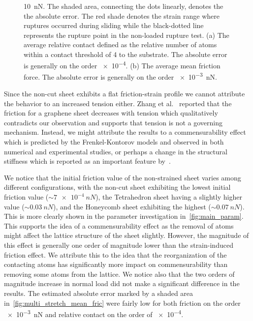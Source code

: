 \begin{figure}[H]
{     \SI{10}{nN}. The shaded area, connecting the dots linearly, denotes the
     the absolute error. The red shade denotes the strain range where ruptures
     occurred during sliding while the black-dotted line represents the rupture
     point in the non-loaded rupture test. (a) The average relative contact
     defined as the relative number of atoms within a contact threshold of
     \SI{4}{} to the substrate. The absolute error is generally on the
     order \num{e-4}. (b) The average mean friction force. The absolute error is generally on the order \SI{e-3}{nN}.}
     \label{fig:multi_stretch}
\end{figure}



Since the non-cut sheet exhibits a
flat friction-strain profile we cannot attribute the behavior to an increased
tension either. Zhang et al.~\cite{zhang_tuning_2019} reported that the friction
for a graphene sheet decreases with tension which qualitatively contradicts our
observation and supports that tension is not a governing mechanism. Instead, we
might attribute the results to a commensurability effect which is predicted by the Frenkel-Kontorov models and observed in both numerical and experimental studies, or perhaps a change in the structural stiffness which is reported as an important feature by~\cite{Kim_2012}. 

We notice that the initial friction value of the non-strained sheet varies among different configurations, with the non-cut sheet exhibiting the lowest initial friction value ($\sim \SI{7e-4}{nN}$), the Tetrahedron sheet having a slightly higher value ($\sim \SI{0.03}{nN}$), and the Honeycomb sheet exhibiting the highest ($\sim \SI{0.07}{nN}$). This is more clearly shown in the parameter investigation in~\cref{fig:main_param}. This supports the idea of a commensurability effect as the removal of atoms might affect the lattice structure of the sheet slightly. However, the magnitude of this effect is generally one order of magnitude lower than the strain-induced friction effect. We attribute this to the idea that the reorganization of the contacting atoms has significantly more impact on commensurability than removing some atoms from the lattice. We notice also that the two orders of magnitude increase in normal load did not
make a significant difference in the results. The estimated absolute error
marked by a shaded area in~\cref{fig:multi_stretch_mean_fric} were fairly low
for both friction on the order \SI{e-3}{nN} and relative contact on the order of
\num{e-4}.


